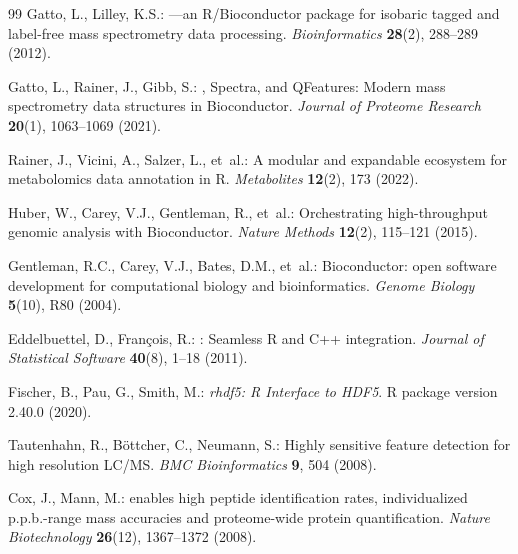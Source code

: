 \documentclass[11pt,twoside,openright]{book}
\begin{document}
\begin{thebibliography}{99}
Gatto, L., Lilley, K.S.:
---an {R/Bioconductor} package for isobaric tagged and label-free mass spectrometry data processing.
\newblock \emph{Bioinformatics} \textbf{28}(2), 288--289 (2012).
\newblock {}

Gatto, L., Rainer, J., Gibb, S.:
, {Spectra}, and {QFeatures}: Modern mass spectrometry data structures in {Bioconductor}.
\newblock \emph{Journal of Proteome Research} \textbf{20}(1), 1063--1069 (2021).
\newblock {}

Rainer, J., Vicini, A., Salzer, L., et~al.:
\newblock A modular and expandable ecosystem for metabolomics data annotation in {R}.
\newblock \emph{Metabolites} \textbf{12}(2), 173 (2022).
\newblock {}

Huber, W., Carey, V.J., Gentleman, R., et~al.:
\newblock Orchestrating high-throughput genomic analysis with {Bioconductor}.
\newblock \emph{Nature Methods} \textbf{12}(2), 115--121 (2015).
\newblock {}

Gentleman, R.C., Carey, V.J., Bates, D.M., et~al.:
\newblock Bioconductor: open software development for computational biology and bioinformatics.
\newblock \emph{Genome Biology} \textbf{5}(10), R80 (2004).
\newblock {}

Eddelbuettel, D., Fran\c{c}ois, R.:
: Seamless {R} and {C++} integration.
\newblock \emph{Journal of Statistical Software} \textbf{40}(8), 1--18 (2011).
\newblock {}

Fischer, B., Pau, G., Smith, M.:
\newblock \emph{rhdf5: R Interface to HDF5}.
\newblock R package version 2.40.0 (2020).
\newblock {}

Tautenhahn, R., B\"ottcher, C., Neumann, S.:
\newblock Highly sensitive feature detection for high resolution {LC/MS}.
\newblock \emph{BMC Bioinformatics} \textbf{9}, 504 (2008).
\newblock {}

Cox, J., Mann, M.:
 enables high peptide identification rates, individualized p.p.b.-range mass accuracies and proteome-wide protein quantification.
\newblock \emph{Nature Biotechnology} \textbf{26}(12), 1367--1372 (2008).
\newblock {}


\end{thebibliography}
\end{document}
